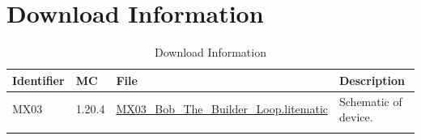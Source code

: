 \documentclass[10pt]{datasheet}
\begin{document}
\section{Download Information}
\begin{table}[H]
    \caption{Download Information}
    \begin{tabularx}{\textwidth}{l | l | l | X}
        \thickhline
        \textbf{Identifier} & \textbf{MC} & \textbf{File} & \textbf{Description} \\
        \hline
        MX03 & 1.20.4 & \href{https://github.com/Soontech-Annals/Archive/blob/b56572c0d2b4f182d9e9d41449d8cb2963b923ae/Archive/everything-bagel/MX03\%20Bob\%20The\%20Builder\%20Loop/MX03\_Bob\_The\_Builder\_Loop.litematic?raw=1}{MX03\_Bob\_The\_Builder\_Loop.litematic} & Schematic of device. \\
        \hline
        \thickhline
    \end{tabularx}
\end{table}
\end{document}
